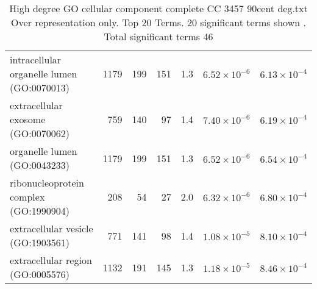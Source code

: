 \begin{table}[ht]
\begin{adjustbox}{width=\textwidth}
\begin{tabular}{lrrrrrr}
  intracellular organelle lumen (GO:0070013) & 1179 & 199 & 151 & 1.3 & $6.52 \times 10^{-6}$ & $6.13 \times 10^{-4}$ \\ 
  extracellular exosome (GO:0070062) & 759 & 140 & 97 & 1.4 & $7.40 \times 10^{-6}$ & $6.19 \times 10^{-4}$ \\ 
  organelle lumen (GO:0043233) & 1179 & 199 & 151 & 1.3 & $6.52 \times 10^{-6}$ & $6.54 \times 10^{-4}$ \\ 
  ribonucleoprotein complex (GO:1990904) & 208 & 54 & 27 & 2.0 & $6.32 \times 10^{-6}$ & $6.80 \times 10^{-4}$ \\ 
  extracellular vesicle (GO:1903561) & 771 & 141 & 98 & 1.4 & $1.08 \times 10^{-5}$ & $8.10 \times 10^{-4}$ \\ 
  extracellular region (GO:0005576) & 1132 & 191 & 145 & 1.3 & $1.18 \times 10^{-5}$ & $8.46 \times 10^{-4}$ \\ 
   \hline
\end{tabular}
\end{adjustbox}
\caption{High degree GO cellular component complete CC 3457 90cent deg.txt Over representation only. Top 20 Terms. 20 significant terms shown . Total significant terms 46} 
\label{tab:GO cellular component complete CC 3457 90cent deg.txt Over representation only. Top 20 Terms. 20 significant terms shown . Total significant terms 46}
\end{table}





